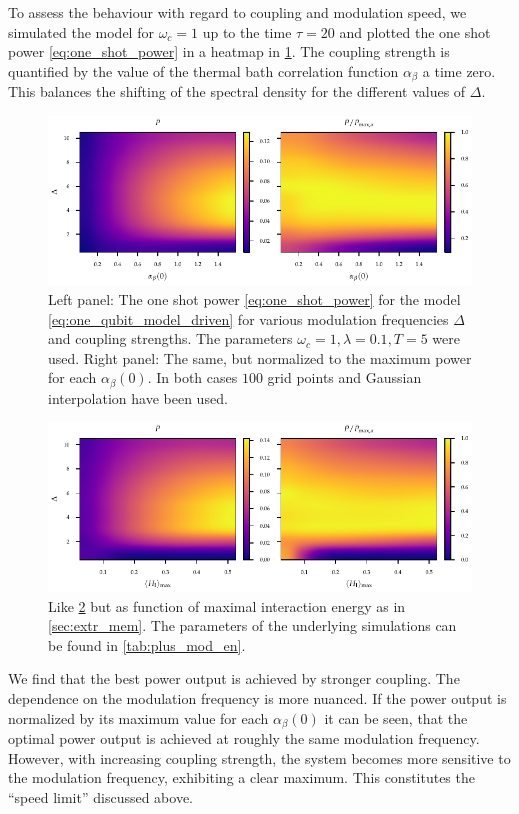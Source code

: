 To assess the behaviour with regard to coupling and modulation speed,
we simulated the model for \(ω_{c}=1\) up to the time \(τ=20\) and
plotted the one shot power \cref{eq:one_shot_power} in a heatmap in
\cref{fig:power_heatmap}. The coupling strength is quantified by the
value of the thermal bath correlation function \(α_{β}\) a time
zero. This balances the shifting of the spectral density for the
different values of \(Δ\).
\begin{figure}[htb]
  \centering
  \includegraphics{figs/one_bath_mod/power_heatmap}
  \caption{\label{fig:power_heatmap} Left panel: The one shot power
    \cref{eq:one_shot_power} for the model
    \cref{eq:one_qubit_model_driven} for various modulation
    frequencies \(Δ\) and coupling strengths. The parameters
    \(ω_{c}=1,λ=0.1, T=5\) were used. Right panel: The same, but
    normalized to the maximum power for each \(α_{β}(0)\). In both
    cases \(100\) grid points and Gaussian interpolation have been
    used.}
\end{figure}
\begin{figure}[htb]
  \centering
  \includegraphics{figs/one_bath_mod/power_en_heatmap}
  \caption{\label{fig:power_heatmap_tuned} Like
    \cref{fig:power_heatmap_tuned} but as function of maximal
    interaction energy as in \cref{sec:extr_mem}.  The parameters of
    the underlying simulations can be found in \cref{tab:plus_mod_en}.}
\end{figure}

We find that the best power output is achieved by stronger
coupling. The dependence on the modulation frequency is more
nuanced. If the power output is normalized by its maximum value for
each \(α_{β}(0)\) it can be seen, that the optimal power output is
achieved at roughly the same modulation frequency. However, with
increasing coupling strength, the system becomes more sensitive to the
modulation frequency, exhibiting a clear maximum. This constitutes the
``speed limit'' discussed above.

